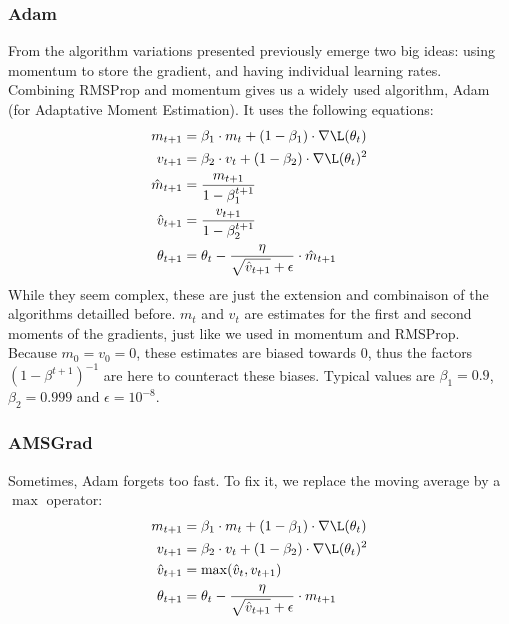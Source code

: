 \subsubsection{Adam}
From the algorithm variations presented previously emerge two big ideas: using momentum to store the gradient, and having individual learning rates. Combining RMSProp and momentum gives us a widely used algorithm, Adam (for Adaptative Moment Estimation). It uses the following equations:
\begin{equation*}
    \begin{aligned}
        m_{t+1} &= \beta_1\cdot m_t + (1-\beta_1)\cdot\nabla\L(\theta_t)\\
        v_{t+1} &= \beta_2\cdot v_t + (1-\beta_2)\cdot\nabla\L(\theta_t)^2\\
        \hat{m}_{t+1} &= \frac{m_{t+1}}{1-\beta_1^{t+1}}\\
        \hat{v}_{t+1} &= \frac{v_{t+1}}{1-\beta_2^{t+1}}\\
        \theta_{t+1} &= \theta_t - \frac{\eta}{\sqrt{\hat{v}_{t+1}}+\epsilon}\cdot\hat{m}_{t+1}
    \end{aligned}
\end{equation*}
While they seem complex, these are just the extension and combinaison of the algorithms detailled before. $m_t$ and $v_t$ are estimates for the first and second moments of the gradients, just like we used in momentum and RMSProp. Because $m_0=v_0=0$, these estimates are biased towards $0$, thus the factors $(1-\beta^{t+1})^{-1}$ are here to counteract these biases. Typical values are $\beta_1=0.9$, $\beta_2=0.999$ and $\epsilon=10^{-8}$.

\subsubsection{AMSGrad}
Sometimes, Adam forgets too fast. To fix it, we replace the moving average by a $\max$ operator:
\begin{equation*}
    \begin{aligned}
        m_{t+1} &= \beta_1\cdot m_t + (1-\beta_1)\cdot\nabla\L(\theta_t)\\
        v_{t+1} &= \beta_2\cdot v_t + (1-\beta_2)\cdot\nabla\L(\theta_t)^2\\
        \hat{v}_{t+1} &= \max(\hat{v}_t, v_{t+1})\\
        \theta_{t+1} &= \theta_t - \frac{\eta}{\sqrt{\hat{v}_{t+1}}+\epsilon}\cdot m_{t+1}
    \end{aligned}
\end{equation*}

